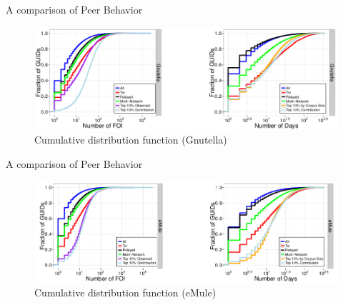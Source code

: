 \documentclass[notes]{beamer}
\begin{document}
\begin{frame}

\begin{block}{A comparison of Peer Behavior}

\begin{figure}[!htb]
\centering
\includegraphics[scale=0.35]{CDF_characterization_gnutella}
\caption{Cumulative distribution function (Gnutella)}
\label{fig:CDF_characterization_gnutella}
\end{figure}

\end{block}

\end{frame}

\begin{frame}

\begin{block}{A comparison of Peer Behavior}

\begin{figure}[!htb]
\centering
\includegraphics[scale=0.35]{CDF_characterization_emule}
\caption{Cumulative distribution function (eMule)}
\label{fig:CDF_characterization_emule}
\end{figure}

\end{block}

\end{frame}
\end{document}
